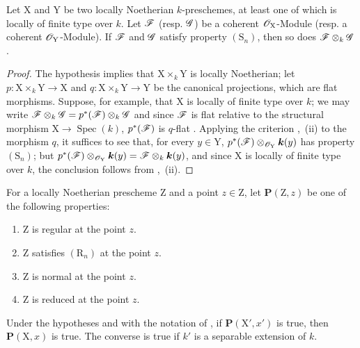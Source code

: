 \begin{corollary}[6.7.3]
\label{IV.6.7.3}
Let $\mathrm{X}$ and $\mathrm{Y}$ be two locally Noetherian $k$-preschemes, at least one of which is locally of finite type over $k$. Let $\mathscr{F}$ \textup{(resp.} $\mathscr{G}$) be a coherent $\mathscr{O}_{\mathrm{X}}$-Module \textup{(resp.} a coherent $\mathscr{O}_{\mathrm{Y}}$-Module). If $\mathscr{F}$ and $\mathscr{G}$ satisfy property $(\mathrm{S}_n)$, then so does $\mathscr{F}\otimes_k\mathscr{G}$.
\end{corollary}

\begin{proof}
The hypothesis implies that $\mathrm{X}\times_k\mathrm{Y}$ is locally Noetherian; let $p:\mathrm{X}\times_k\mathrm{Y}\to\mathrm{X}$ and $q:\mathrm{X}\times_k\mathrm{Y}\to\mathrm{Y}$ be the canonical projections, which are flat morphisms. Suppose, for example, that $\mathrm{X}$ is locally of finite type over $k$; we may write $\mathscr{F}\otimes_k\mathscr{G}=p^*(\mathscr{F})\otimes_k\mathscr G$ and since $\mathscr{F}$ is flat relative to the structural morphism $\mathrm{X}\to\operatorname{Spec}(k)$, $p^*(\mathscr{F})$ is $q$-flat . Applying the criterion ,~(ii) to the morphism $q$, it suffices to see that, for every $y\in\mathrm{Y}$, $p^*(\mathscr{F})\otimes_{\mathscr{O}_{\mathrm{Y}}}\boldsymbol{k}(y)$ has property $(\mathrm{S}_n)$; but
$p^*(\mathscr{F})\otimes_{\mathscr{O}_{\mathrm{Y}}}\boldsymbol{k}(y)=\mathscr{F}\otimes_k\boldsymbol{k}(y)$, and since $\mathrm{X}$ is locally of finite type over $k$, the conclusion follows from ,~(ii).
\end{proof}

\begin{proposition}[6.7.4]
\label{IV.6.7.4}
For a locally Noetherian prescheme $\mathrm{Z}$ and a point $z\in\mathrm{Z}$, let $\boldsymbol{P}(\mathrm{Z},z)$ be one of the following properties:
\begin{enumerate}[label=\emph{\alph*)}]
  \item $\mathrm{Z}$ is regular at the point $z$.
  \item $\mathrm{Z}$ satisfies $(\mathrm{R}_n)$ at the point $z$.
  \item $\mathrm{Z}$ is normal at the point $z$.
  \item $\mathrm{Z}$ is reduced at the point $z$.
\end{enumerate}
Under the hypotheses and with the notation of , if $\boldsymbol{P}(\mathrm{X}',x')$ is true, then $\boldsymbol{P}(\mathrm{X},x)$ is true. The converse is true if $k'$ is a separable extension of $k$.
\end{proposition}

